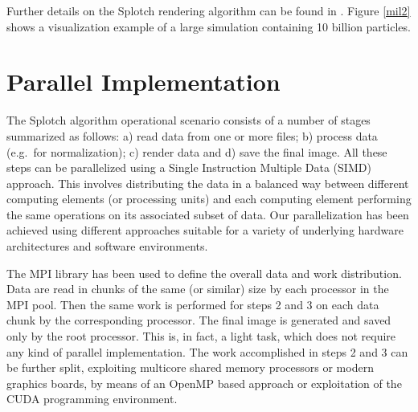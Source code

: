 \documentclass[1p,times]{elsarticle}
\begin{document}
%

Further details on the Splotch rendering algorithm can be found in \citep{2008NJPh...10l5006D}. 
Figure \ref{mil2} shows a visualization example of a large simulation
containing 10 billion particles.

\section{Parallel Implementation}
\label{parallel}

The Splotch algorithm operational scenario consists of a number of 
stages summarized as follows: a) read data from one or more files; b) process data (e.g.\ for normalization); c) render data and d) save the final image. All these steps can be parallelized using a
Single Instruction Multiple Data (SIMD) approach. This involves distributing the data 
in a balanced way between different computing elements (or processing units) and each computing element performing the same operations on its associated subset of data. Our parallelization has been achieved using different approaches suitable for a variety of underlying hardware architectures and software environments.

The MPI library \cite{mpi} has been used to define the overall data and work 
distribution. Data are read in chunks of the same (or similar) size by each processor
in the MPI pool. Then the same work is performed for steps 2 and 3 on each data chunk by the
corresponding processor. The final image is generated and saved only by the root processor. This is, in fact, a light task, which does not require any kind of parallel implementation.
The work accomplished in steps 2 and 3 can be further split, exploiting 
multicore shared memory processors or modern graphics boards, by means of
an OpenMP based approach or exploitation of the CUDA programming 
environment. 
\end{document}
